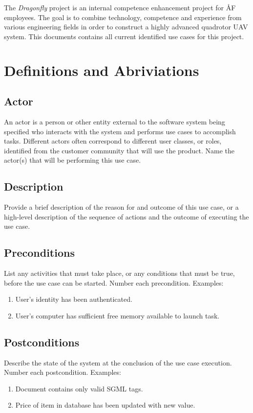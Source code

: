 \documentclass[a4paper]{article}
\begin{document}
The \emph{Dragonfly} project is an internal competence enhancement project for ÅF employees. The goal is to combine technology, competence and experience from various engineering fields in order to construct a highly advanced quadrotor UAV system. This documents contains all current identified use cases for this project.

\section{Definitions and Abriviations}

\subsection{Actor}
An actor is a person or other entity external to the software system being specified who interacts with the system and performs use cases to accomplish tasks. Different actors often correspond to different user classes, or roles, identified from the customer community that will use the product. Name the actor(s) that will be performing this use case.
\subsection{Description}
Provide a brief description of the reason for and outcome of this use case, or a high-level description of the sequence of actions and the outcome of executing the use case.
\subsection{Preconditions}
List any activities that must take place, or any conditions that must be true, before the use case can be started. Number each precondition. Examples:
\begin{enumerate}
	\item User’s identity has been authenticated.
	\item User’s computer has sufficient free memory available to launch task.
\end{enumerate}
\subsection{Postconditions}
Describe the state of the system at the conclusion of the use case execution. Number each postcondition. Examples:
\begin{enumerate}
	\item Document contains only valid SGML tags.
	\item Price of item in database has been updated with new value.
\end{enumerate}
\end{document}
